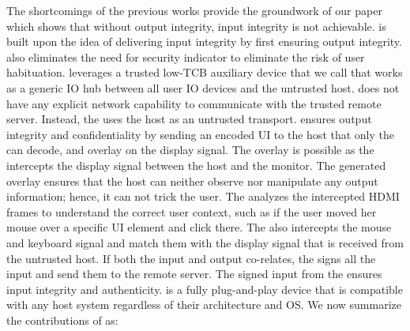  
 The shortcomings of the previous works provide the groundwork of our paper which shows that without output integrity, input integrity is not achievable. \name is built upon the idea of delivering input integrity by first ensuring output integrity. \name also eliminates the need for security indicator to eliminate the risk of user habituation. \name leverages a trusted low-TCB auxiliary device that we call \device that works as a generic IO hub between all user IO devices and the untrusted host. \device does not have any explicit network capability to communicate with the trusted remote server. Instead, the \device uses the host as an untrusted transport. \device ensures output integrity and confidentiality by sending an encoded UI to the host that only the \device can decode, and overlay on the display signal. The overlay is possible as the \device intercepts the display signal between the host and the monitor. The \device generated overlay ensures that the host can neither observe nor manipulate any output information; hence, it can not trick the user. The \device analyzes the intercepted HDMI frames to understand the correct user context, such as if the user moved her mouse over a specific UI element and click there. The \device also intercepts the mouse and keyboard signal and match them with the display signal that is received from the untrusted host. If both the input and output co-relates, the \device signs all the input and send them to the remote server. The signed input from the \device ensures input integrity and authenticity. \device is a fully plug-and-play device that is compatible with any host system regardless of their architecture and OS. We now summarize the contributions of \name as: 



